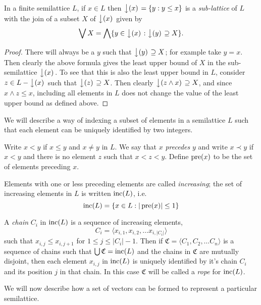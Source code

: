 \documentclass{report}
\begin{document}
\begin{prop}
In a finite semilattice $L$, if $x \in L$ then $\left\downarrow(x)\right. = \{y : y 
\le x\}$ is a \emph{sub-lattice} of $L$ with the join of a subset $X$ of $\left\downarrow(x)\right.$ 
given by
$$\bigvee X = \bigwedge\{y \in \left\downarrow(x)\right. : \left\downarrow(y)\right. \supseteq X\}.$$
\end{prop}
\begin{proof}
There will always be a $y$ such that $\left\downarrow(y)\right. \supseteq X$; for 
example take $y = x$. Then clearly the above formula gives the least 
upper bound of $X$ in the sub-semilattice $\left\downarrow(x)\right.$. To see that this is also the least upper bound in $L$, consider $z \in L - \left\downarrow(x)\right.$ such that $\left\downarrow(z)\right. \supseteq X$. Then clearly $\left\downarrow(z\land x)\right. \supseteq X$, and since $x\land z \le x$, including all elements in $L$ does not change the value of the least upper bound as defined above.
\end{proof}

We will describe a way of indexing a subset of elements in a semilattice $L$ 
such that each element can be uniquely identified by two integers. 
    
\begin{defn}
    Write $x < y$ if $x \le y$ and $x \neq y$ in $L$. We say that $x$ 
    \emph{precedes} $y$ and write $x \prec y$ if $x < y$ and there is no 
    element $z$ such that $x < z < y$. Define $\operatorname{pre}(x)$ to be the set of 
    elements preceding $x$.%

    Elements with one or less preceding elements are called 
    \emph{increasing}; the set of increasing elements in $L$ is 
    written $\operatorname{inc}(L)$, i.e.
    $$\operatorname{inc}(L) = \{x \in L : |\operatorname{pre}(x)| \le 1\}$$
 
    A \emph{chain} $C_{i}$ in $\operatorname{inc}(L)$ is a sequence of increasing
    elements, 
    $$C_{i} = \langle x_{i,1}, x_{i,2}, \ldots x_{i,|C_{i}|}\rangle$$
     such that $x_{i,j}\le x_{i,j+1}$ for $1 \le j
    \le |C_{i}| - 1$.  Then if $\mathfrak{C} = \langle
    C_{1},C_{2},\ldots C_{n}\rangle$ is a sequence of chains such that
    $\bigcup \mathfrak{C} = \operatorname{inc}(L)$ and the chains in $\mathfrak{C}$
    are mutually disjoint, then each element $x_{i,j}$ in
    $\operatorname{inc}(L)$ is uniquely identified by it's chain $C_i$ and its position
    $j$ in that chain. In this case $\mathfrak{C}$ will be called a 
    \emph{rope} for $\operatorname{inc}(L)$.
\end{defn}

We will now describe how a set of vectors can be formed to represent 
a particular semilattice.
\end{document}
